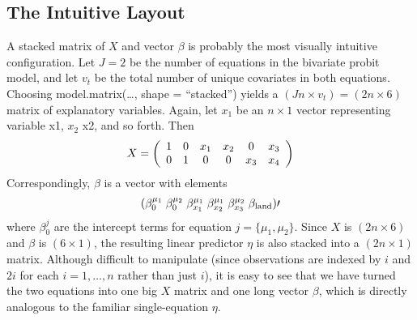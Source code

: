 \documentclass[letterpaper,10pt,english]{sphinxmanual}
\begin{document}
\subsection{The Intuitive Layout}
\label{8_writing_new_models:the-intuitive-layout}
A stacked matrix of \(X\) and vector \(\beta\) is probably the
most visually intuitive configuration. Let \(J = 2\) be the number
of equations in the bivariate probit model, and let \(v_t\) be the
total number of unique covariates in both equations. Choosing
model.matrix(…, shape = “stacked”) yields a \((Jn \times v_t) =
(2n \times 6)\) matrix of explanatory variables. Again, let \(x_1\)
be an \(n \times 1\) vector representing variable x1, \(x_2\)
x2, and so forth. Then
\begin{gather}
\begin{split}X = \left (\begin{array}{cccccc}
1 & 0 & x_1 & x_2 & 0   & x_3  \\
0 & 1 & 0   & 0   & x_3 & x_4
\end{array} \right)\end{split}\notag
\end{gather}
Correspondingly, \(\beta\) is a vector with elements
\begin{gather}
\begin{split}(\beta_0^{\mu_1} \; \beta_0^{\mu_2} \; \beta_{x_1}^{\mu_1} \;
\beta_{x_2}^{\mu_1} \; \beta_{x_3}^{\mu_2} \; \beta_{\textrm{land}})\prime\end{split}\notag
\end{gather}
where \(\beta_0^j\) are the intercept terms for equation
\(j = \{\mu_1,
\mu_2\}\). Since \(X\) is \((2n \times 6)\) and \(\beta\) is
\((6 \times 1)\), the resulting linear predictor \(\eta\) is
also stacked into a \((2n \times
1)\) matrix. Although difficult to manipulate (since observations are
indexed by \(i\) and \(2i\) for each \(i = 1, \dots, n\)
rather than just \(i\)), it is easy to see that we have turned the
two equations into one big \(X\) matrix and one long vector
\(\beta\), which is directly analogous to the familiar
single-equation \(\eta\).
\end{document}
